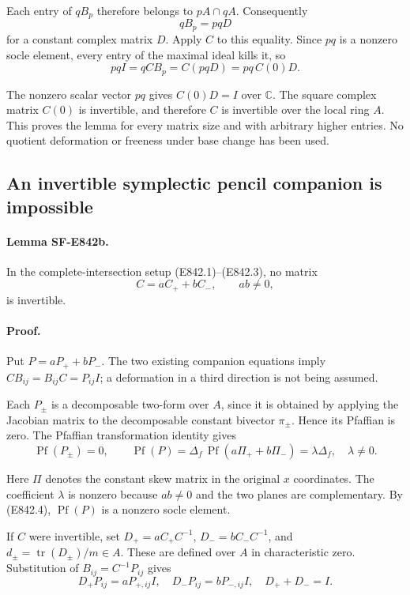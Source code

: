 Each entry of \(qB_p\) therefore belongs to \(pA\cap qA\). Consequently
\[
 qB_p=pqD
 \tag{E842.8}
\]
for a constant complex matrix \(D\). Apply \(C\) to this equality.
Since \(pq\) is a nonzero socle element, every entry of the maximal ideal
kills it, so
\[
 pqI=qCB_p=C(pqD)=pq\,C(0)D.
 \tag{E842.9}
\]

The nonzero scalar vector \(pq\) gives \(C(0)D=I\) over \(\mathbb C\).
The square complex matrix \(C(0)\) is invertible, and therefore \(C\) is
invertible over the local ring \(A\). This proves the lemma for every
matrix size and with arbitrary higher entries. No quotient deformation
or freeness under base change has been used.

\subsection{An invertible symplectic pencil companion is impossible}
\label{SF-E842:pencil}

\paragraph{Lemma SF-E842b.}
In the complete-intersection setup (E842.1)--(E842.3), no matrix
\[
                  C=aC_++bC_-,\qquad ab\ne0,
 \tag{E842.10}
\]
is invertible.

\paragraph{Proof.}
Put \(P=aP_++bP_-\). The two existing companion equations imply
\(CB_{ij}=B_{ij}C=P_{ij}I\); a deformation in a third direction is not
being assumed.

Each \(P_\pm\) is a decomposable two-form over \(A\), since it is obtained
by applying the Jacobian matrix to the decomposable constant bivector
\(\pi_\pm\). Hence its Pfaffian is zero. The Pfaffian transformation
identity gives
\[
 \operatorname{Pf}(P_\pm)=0,\qquad
 \operatorname{Pf}(P)
   =\Delta_f\,\operatorname{Pf}(a\Pi_++b\Pi_-)
   =\lambda\Delta_f,\quad \lambda\ne0.
 \tag{E842.11}
\]

Here \(\Pi\) denotes the constant skew matrix in the original \(x\)
coordinates. The coefficient \(\lambda\) is nonzero because \(ab\ne0\)
and the two planes are complementary. By (E842.4),
\(\operatorname{Pf}(P)\) is a nonzero socle element.

If \(C\) were invertible, set \(D_+=aC_+C^{-1}\),
\(D_-=bC_-C^{-1}\), and \(d_\pm=\operatorname{tr}(D_\pm)/m\in A\).
These are defined over \(A\) in characteristic zero.
Substitution of \(B_{ij}=C^{-1}P_{ij}\) gives
\[
 D_+P_{ij}=aP_{+,ij}I,\quad
 D_-P_{ij}=bP_{-,ij}I,\quad
 D_++D_-=I.
 \tag{E842.12}
\]

